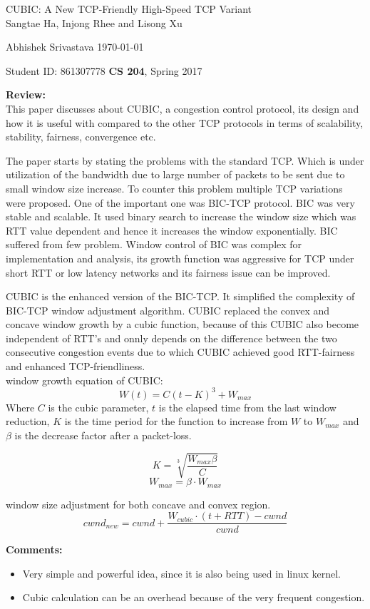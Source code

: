 \documentclass[a4paper,12pt, twoside]{article}
\renewcommand{\maketitle}{%
 	\Large
 	\begin{center}
 	CUBIC: A New TCP-Friendly High-Speed TCP Variant\\	
 	\normalsize Sangtae Ha, Injong Rhee and Lisong Xu
 	\end{center}
 
 	\Large
	Abhishek Srivastava
	\hfill
	\normalsize
	\today
 	\par
 	Student ID: 861307778
 	\hfill
 	\textbf{CS 204}, Spring 2017
 	\par 	
 	\hrulefill
 	\par
 	}
\begin{document}
\thispagestyle{empty}
	
\maketitle

\textbf{Review:}\\
This paper discusses about CUBIC, a congestion control protocol, its design and how it is useful with compared to the other TCP protocols in terms of scalability, stability, fairness, convergence etc.


The paper starts by stating the problems with the standard TCP. Which is under utilization of the bandwidth due to large number of packets to be sent due to small window size increase. To counter this problem multiple TCP variations were proposed. One of the important one was BIC-TCP protocol. BIC was very stable and scalable. It used binary search to increase the window size which was RTT value dependent and hence it increases the window exponentially. BIC suffered from few problem. Window control of BIC was complex for implementation and analysis, its growth function was aggressive for TCP under short RTT or low latency networks and its fairness issue can be improved. 


CUBIC is the enhanced version of the BIC-TCP. It simplified the complexity of BIC-TCP window adjustment algorithm. CUBIC replaced the convex and concave window growth by a cubic function, because of this CUBIC also become independent of RTT's and onnly depends on the difference between the two consecutive congestion events due to which CUBIC achieved good RTT-fairness and enhanced TCP-friendliness.\\ 

window growth equation of CUBIC:
\begin{equation}
W(t) = C(t-K)^3 + W_{max}
\end{equation}
Where $C$ is the cubic parameter, $t$ is the elapsed time from the last window reduction, $K$ is the time period for the function to increase from $W$ to $W_{max}$ and $\beta$ is the decrease factor after a packet-loss. 

\begin{equation}
K = \sqrt[3]{\frac{W_{max}\beta}{C}}
\end{equation}
\begin{equation}
W_{max} = \beta \cdot W_{max}
\end{equation}

window size adjustment for both concave and convex region.
\begin{equation}
cwnd_{new} = cwnd + \frac{W_{cubic} \cdot (t+RTT) - cwnd}{cwnd}
\end{equation}

\textbf{Comments:}
\begin{itemize}
	\item Very simple and powerful idea, since it is also being used in linux kernel.
	\item Cubic calculation can be an overhead because of the very frequent congestion. 
\end{itemize}
\end{document}
